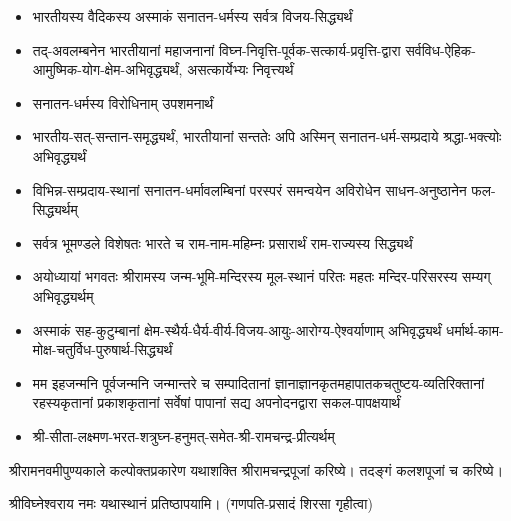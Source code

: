 \begin{itemize}

    \item भारतीयस्य वैदिकस्य अस्माकं सनातन-धर्मस्य सर्वत्र विजय-सिद्ध्यर्थं
    
    \item तद्-अवलम्बनेन भारतीयानां महाजनानां विघ्न-निवृत्ति-पूर्वक-सत्कार्य-प्रवृत्ति-द्वारा सर्वविध-ऐहिक-आमुष्मिक-योग-क्षेम-अभिवृद्ध्यर्थं, असत्कार्येभ्यः निवृत्त्यर्थं
    
    \item सनातन-धर्मस्य विरोधिनाम् उपशमनार्थं
    
    \item भारतीय-सत्-सन्तान-समृद्ध्यर्थं, भारतीयानां सन्ततेः अपि अस्मिन् सनातन-धर्म-सम्प्रदाये श्रद्धा-भक्त्योः अभिवृद्ध्यर्थं
    
    \item विभिन्न-सम्प्रदाय-स्थानां सनातन-धर्मावलम्बिनां परस्परं समन्वयेन अविरोधेन साधन-अनुष्ठानेन फल-सिद्ध्यर्थम्
    
    \item सर्वत्र भूमण्डले विशेषतः भारते च राम-नाम-महिम्नः प्रसारार्थं राम-राज्यस्य सिद्ध्यर्थं
    
    \item अयोध्यायां भगवतः श्रीरामस्य जन्म-भूमि-मन्दिरस्य मूल-स्थानं परितः महतः मन्दिर-परिसरस्य सम्यग् अभिवृद्ध्यर्थम्
    
    \item अस्माकं सह-कुटुम्बानां क्षेम-स्थैर्य-धैर्य-वीर्य-विजय-आयुः-आरोग्य-ऐश्वर्याणाम् अभिवृद्ध्यर्थं धर्मार्थ-काम-मोक्ष-चतुर्विध-पुरुषार्थ-सिद्ध्यर्थं
    
    \item मम इहजन्मनि पूर्वजन्मनि जन्मान्तरे च सम्पादितानां ज्ञानाज्ञानकृतमहा\-पातकचतुष्टय-व्यतिरिक्तानां रहस्यकृतानां प्रकाशकृतानां सर्वेषां पापानां सद्य अपनोदनद्वारा सकल-पापक्षयार्थं 

    \item श्री-सीता-लक्ष्मण-भरत-शत्रुघ्न-हनुमत्-समेत-श्री-रामचन्द्र-प्रीत्यर्थम्
    
    \end{itemize}

श्रीरामनवमीपुण्यकाले कल्पोक्तप्रकारेण यथाशक्ति श्रीरामचन्द्रपूजां
करिष्ये।
तदङ्गं कलशपूजां च करिष्ये।


श्रीविघ्नेश्वराय नमः यथास्थानं प्रतिष्ठापयामि।
(गणपति-प्रसादं शिरसा गृहीत्वा)





